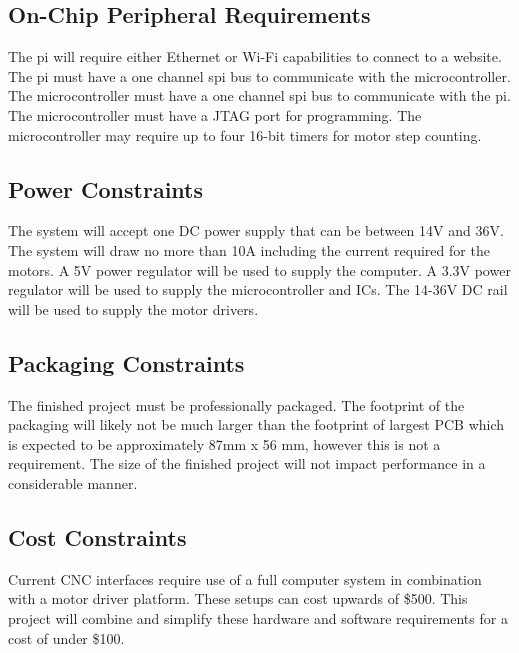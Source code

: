 \subsection{On-Chip Peripheral Requirements}
The \gls{pi} will require either Ethernet or Wi-Fi capabilities to connect to a website.
The \gls{pi} must have a one channel \gls{spi} bus to communicate with the microcontroller. 
The microcontroller must have a one channel \gls{spi} bus to communicate with the \gls{pi}.
The microcontroller must have a JTAG port for programming.
The microcontroller may require up to four 16-bit timers for motor step counting.

\subsection{Power Constraints}
The system will accept one DC power supply that can be between 14V and 36V.
The system will draw no more than 10A including the current required for the motors.
A 5V power regulator will be used to supply the computer.
A 3.3V power regulator will be used to supply the microcontroller and ICs.
The 14-36V DC rail will be used to supply the motor drivers. 

\subsection{Packaging Constraints}
The finished project must be professionally packaged.
The footprint of the packaging will likely not be much larger than the footprint of largest PCB which is expected to be approximately 87mm x 56 mm, however this is not a requirement.
The size of the finished project will not impact performance in a considerable manner.

\subsection{Cost Constraints}
Current CNC interfaces require use of a full computer system in combination with a motor driver platform.
These setups can cost upwards of \$500.
This project will combine and simplify these hardware and software requirements for a cost of under \$100.